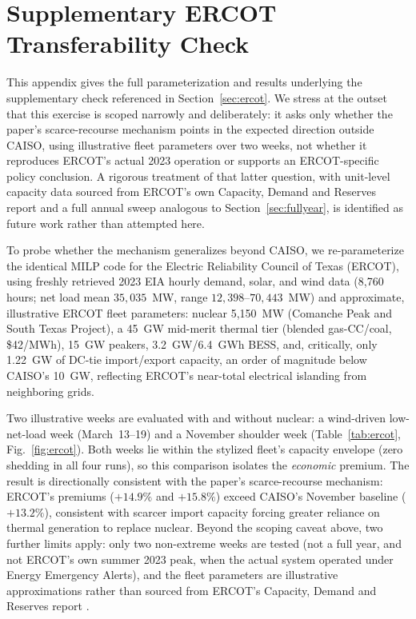 \documentclass[preprint,12pt,authoryear]{elsarticle}
\begin{document}
\clearpage
\setcounter{table}{0}
\setcounter{figure}{0}
\section{Supplementary ERCOT Transferability Check}
\label{app:ercot}

This appendix gives the full parameterization and results underlying the supplementary check referenced in Section~\ref{sec:ercot}. We stress at the outset that this exercise is scoped narrowly and deliberately: it asks only whether the paper's scarce-recourse mechanism points in the expected direction outside CAISO, using illustrative fleet parameters over two weeks, not whether it reproduces ERCOT's actual 2023 operation or supports an ERCOT-specific policy conclusion. A rigorous treatment of that latter question, with unit-level capacity data sourced from ERCOT's own Capacity, Demand and Reserves report and a full annual sweep analogous to Section~\ref{sec:fullyear}, is identified as future work rather than attempted here.

To probe whether the mechanism generalizes beyond CAISO, we re-parameterize the identical MILP code for the Electric Reliability Council of Texas (ERCOT), using freshly retrieved 2023 EIA hourly demand, solar, and wind data (8{,}760 hours; net load mean $35{,}035$~MW, range $12{,}398$--$70{,}443$~MW) and approximate, illustrative ERCOT fleet parameters: nuclear 5{,}150~MW (Comanche Peak and South Texas Project), a 45~GW mid-merit thermal tier (blended gas-CC/coal, \$42/MWh), 15~GW peakers, 3.2~GW/6.4~GWh BESS, and, critically, only 1.22~GW of DC-tie import/export capacity, an order of magnitude below CAISO's 10~GW, reflecting ERCOT's near-total electrical islanding from neighboring grids.

Two illustrative weeks are evaluated with and without nuclear: a wind-driven low-net-load week (March~13--19) and a November shoulder week (Table~\ref{tab:ercot}, Fig.~\ref{fig:ercot}). Both weeks lie within the stylized fleet's capacity envelope (zero shedding in all four runs), so this comparison isolates the \emph{economic} premium. The result is directionally consistent with the paper's scarce-recourse mechanism: ERCOT's premiums ($+14.9\%$ and $+15.8\%$) exceed CAISO's November baseline ($+13.2\%$), consistent with scarcer import capacity forcing greater reliance on thermal generation to replace nuclear. Beyond the scoping caveat above, two further limits apply: only two non-extreme weeks are tested (not a full year, and not ERCOT's own summer 2023 peak, when the actual system operated under Energy Emergency Alerts), and the fleet parameters are illustrative approximations rather than sourced from ERCOT's Capacity, Demand and Reserves report \citep{ercot2023}.
\end{document}
